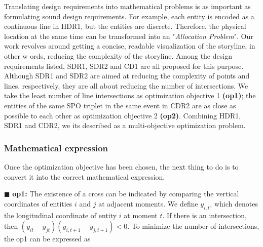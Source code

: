 Translating design requirements into mathematical problems is as important as formulating sound design requirements. For example, each entity is encoded as a continuous line in HDR1, but the entities are discrete. Therefore, the physical location at the same time can be transformed into an "\textit{Allocation Problem}". Our work revolves around getting a concise, readable visualization of the storyline, in other w ords, reducing the complexity of the storyline. Among the design requirements listed, SDR1, SDR2 and CD1 are all proposed for this purpose. Although SDR1 and SDR2 are aimed at reducing the complexity of points and lines, respectively, they are all about reducing the number of intersections. We take the least number of line intersections as optimization objective 1 \textbf{(op1)}; the entities of the same SPO triplet in the same event in CDR2 are as close as possible to each other as optimization objective 2 \textbf{(op2)}. Combining HDR1, SDR1 and CDR2, we its described as a multi-objective optimization problem.

\subsubsection{Mathematical expression}
\noindent Once the optimization objective has been chosen, the next thing to do is to convert it into the correct mathematical expression.

$\blacksquare $ \textbf{op1:} The existence of a cross can be indicated by comparing the vertical coordinates of entities $i$ and $j$ at adjacent moments. We define $y_{i,t}$, which denotes the longitudinal coordinate of entity $i$ at moment $t$. If there is an intersection, then $(y_{it}-y_{jt})(y_{i,t+1}-y_{j,t+1})<0$. To minimize the number of intersections, the op1 can be expressed as

